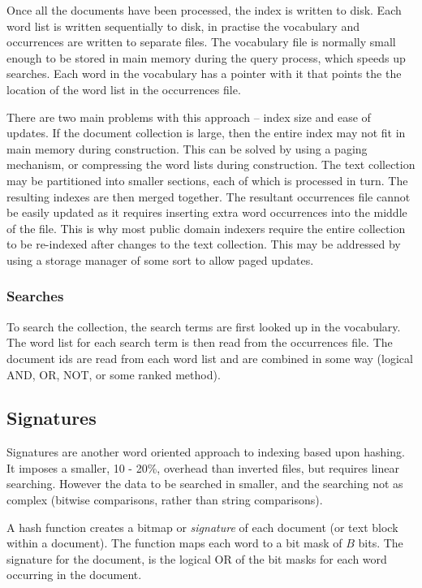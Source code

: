 Once all the documents have been processed, the index is written to disk.
Each word list is written sequentially to disk, in practise the vocabulary
and occurrences are written to separate files.  The vocabulary file is
normally small enough to be stored in main memory during the query
process, which speeds up searches.  Each word in the vocabulary has a
pointer with it that points the the location of the word list in the
occurrences file.

There are two main problems with this approach -- index size and ease of
updates.  If the document collection is large, then the entire index may
not fit in main memory during construction.  This can be solved by using a
paging mechanism, or compressing the word lists during construction.  The
text collection may be partitioned into smaller sections, each of which is
processed in turn.  The resulting indexes are then merged together.  The
resultant occurrences file cannot be easily updated as it requires
inserting extra word occurrences into the middle of the file.  This is why
most public domain indexers require the entire collection to be re-indexed
after changes to the text collection.  This may be addressed by using a
storage manager of some sort to allow paged updates.

\subsubsection{Searches}
To search the collection, the search terms are first looked up in the
vocabulary.  The word list for each search term is then read from the
occurrences file.  The document ids are read from each word list and are
combined in some way (logical AND, OR, NOT, or some ranked method).

\subsection{Signatures}
Signatures are another word oriented approach to indexing based upon
hashing.  It imposes a smaller, 10 - 20\%, overhead than inverted files,
but requires linear searching.  However the data to be searched in
smaller, and the searching not as complex (bitwise comparisons, rather
than string comparisons).

A hash function creates a bitmap or \emph{signature} of each document (or
text block within a document).  The function maps each word to a bit mask
of $B$ bits.  The signature for the document, is the logical OR of the bit
masks for each word occurring in the document.

